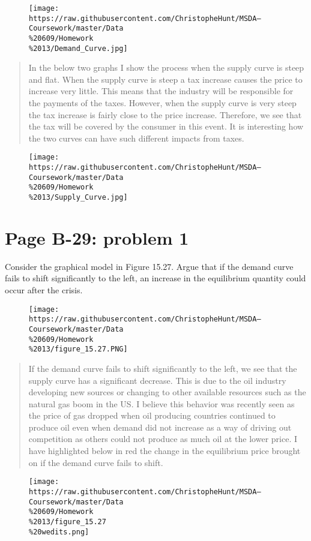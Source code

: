\documentclass[]{article}
\begin{document}
\begin{figure}[htbp]
\centering
\texttt{[image: https://raw.githubusercontent.com/ChristopheHunt/MSDA---Coursework/master/Data\\\%20609/Homework\\\%2013/Demand\_Curve.jpg]}
\caption{}
\end{figure}

\newpage

\begin{quote}
In the below two graphs I show the process when the supply curve is
steep and flat. When the supply curve is steep a tax increase causes the
price to increase very little. This means that the industry will be
responsible for the payments of the taxes. However, when the supply
curve is very steep the tax increase is fairly close to the price
increase. Therefore, we see that the tax will be covered by the consumer
in this event. It is interesting how the two curves can have such
different impacts from taxes.
\end{quote}

\begin{figure}[htbp]
\centering
\texttt{[image: https://raw.githubusercontent.com/ChristopheHunt/MSDA---Coursework/master/Data\\\%20609/Homework\\\%2013/Supply\_Curve.jpg]}
\caption{}
\end{figure}

\newpage

\section{Page B-29: problem 1}\label{page-b-29-problem-1}

Consider the graphical model in Figure 15.27. Argue that if the demand
curve fails to shift significantly to the left, an increase in the
equilibrium quantity could occur after the crisis.

\begin{figure}[htbp]
\centering
\texttt{[image: https://raw.githubusercontent.com/ChristopheHunt/MSDA---Coursework/master/Data\\\%20609/Homework\\\%2013/figure\_15.27.PNG]}
\caption{}
\end{figure}

\begin{quote}
If the demand curve fails to shift significantly to the left, we see
that the supply curve has a significant decrease. This is due to the oil
industry developing new sources or changing to other available resources
such as the natural gas boom in the US. I believe this behavior was
recently seen as the price of gas dropped when oil producing countries
continued to produce oil even when demand did not increase as a way of
driving out competition as others could not produce as much oil at the
lower price. I have highlighted below in red the change in the
equilibrium price brought on if the demand curve fails to shift.
\end{quote}

\begin{figure}[htbp]
\centering
\texttt{[image: https://raw.githubusercontent.com/ChristopheHunt/MSDA---Coursework/master/Data\\\%20609/Homework\\\%2013/figure\_15.27\\\%20wedits.png]}
\caption{}
\end{figure}
\end{document}
